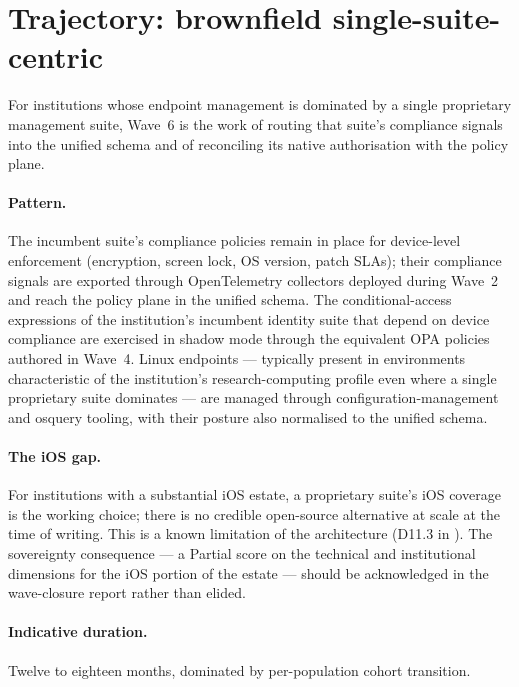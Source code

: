 \section{Trajectory: brownfield single-suite-centric}
\label{sec:w6-brownfield-ms}

For institutions whose endpoint management is dominated by a
single proprietary management suite, Wave~6 is the work of routing
that suite's compliance signals into the unified schema and of
reconciling its native authorisation with the policy plane.

\paragraph{Pattern.} The incumbent suite's compliance policies
remain in place for device-level enforcement (encryption, screen
lock, OS version, patch SLAs); their compliance signals are
exported through OpenTelemetry collectors deployed during Wave~2
and reach the policy plane in the unified schema. The conditional-access
expressions of the institution's incumbent identity suite that
depend on device compliance are exercised in shadow mode through
the equivalent OPA policies authored in Wave~4. Linux endpoints
--- typically present in environments characteristic of the
institution's research-computing profile even where a single
proprietary suite dominates --- are managed through
configuration-management and osquery tooling, with their posture
also normalised to the unified schema.

\paragraph{The iOS gap.} For institutions with a substantial iOS
estate, a proprietary suite's iOS coverage is the working choice;
there is no credible open-source alternative at scale at the time
of writing.
This is a known limitation of the architecture (D11.3 in
). The
sovereignty consequence --- a Partial score on the technical and
institutional dimensions for the iOS portion of the estate ---
should be acknowledged in the wave-closure report rather than
elided.

\paragraph{Indicative duration.} Twelve to eighteen months,
dominated by per-population cohort transition.

